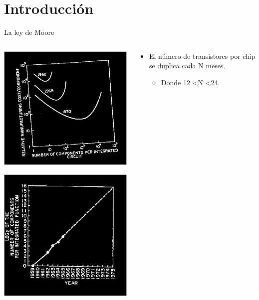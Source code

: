 \section{Introducción}

\begin{frame}[t]{La ley de Moore}
\begin{columns}
  \begin{column}{.5\textwidth}
    \includegraphics[width=.5\textwidth]{images/moore-graph1.jpg}\\
    \begin{flushright}
      \includegraphics[width=.65\textwidth]{images/moore-graph2.jpg}\\
    \end{flushright}
  \end{column}
  \begin{column}{.5\textwidth}
    \begin{itemize}
    \item El número de transistores por chip se duplica cada N meses.
      \begin{itemize}
        \item Donde 12 \textless N \textless 24.

\end{itemize}
\end{itemize}
\end{column}
\end{columns}
\end{frame}
